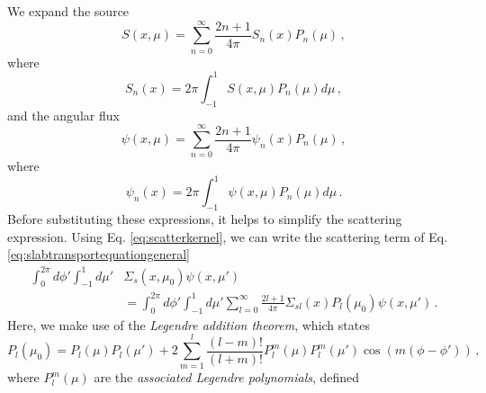 We expand the source
\begin{equation}
 S(x,\mu) = \sum^{\infty}_{n=0} \frac{2n+1}{4\pi} S_{n}(x)P_{n}(\mu) \, , 
 \label{eq:sourceexp}
\end{equation}
where
\begin{equation}
 S_{n}(x) = 2\pi \int^{1}_{-1} S(x,\mu) P_n(\mu) d\mu \, ,
\end{equation}
and the angular flux
\begin{equation}
 \psi(x,\mu) = \sum^{\infty}_{n=0} \frac{2n+1}{4\pi} \psi_{n}(x)P_{n}(\mu) \, , 
 \label{eq:psiexp}
\end{equation}
where
\begin{equation}
 \psi_{n}(x) = 2\pi \int^{1}_{-1} \psi(x,\mu) P_n(\mu) d\mu \, .
\end{equation}
Before substituting these expressions, it helps to simplify the scattering expression.  Using Eq. \ref{eq:scatterkernel}, we can write the scattering term of Eq. \ref{eq:slabtransportequationgeneral}
\begin{equation}
\begin{split}
  \int^{2\pi}_0 d\phi' \int^1_{-1} d\mu'  & \Sigma_s(x,\mu_0)\psi(x,\mu')  \\
  &= \int^{2\pi}_0 d\phi' \int^1_{-1} d\mu'  \sum^{\infty}_{l=0} \frac{2l+1}{4\pi} \Sigma_{sl}(x)P_{l}(\mu_0) \psi(x,\mu') \, .
\end{split}
\end{equation}
Here, we make use of the \textit{Legendre addition theorem}, which states 
\begin{equation}
 P_l(\mu_0) = P_l(\mu)P_l(\mu') + 2\sum^l_{m=1}\frac{(l-m)!}{(l+m)!}P^m_l(\mu)P^m_l(\mu')\cos(m(\phi-\phi')) \, ,
\end{equation}
where $P^m_l(\mu)$ are the \textit{associated Legendre polynomials}, defined
